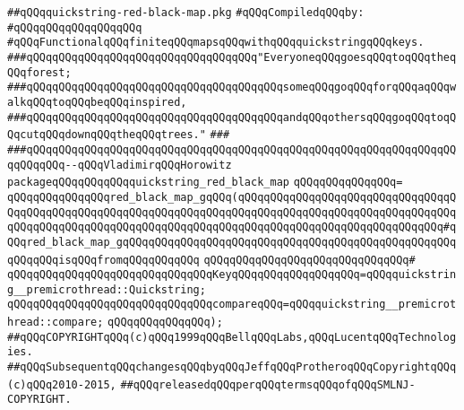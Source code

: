 \label{src/lib/src/quickstring-red-black-map.pkg}
\verb|##qQQqquickstring-red-black-map.pkg|\newline
\newline
\verb|#qQQqCompiledqQQqby:|\newline
\verb|#qQQqqQQqqQQqqQQqqQQq|\newline
\newline
\verb|#qQQqFunctionalqQQqfiniteqQQqmapsqQQqwithqQQqquickstringqQQqkeys.|\newline
\newline
\newline
\verb|###qQQqqQQqqQQqqQQqqQQqqQQqqQQqqQQqqQQq"EveryoneqQQqgoesqQQqtoqQQqtheqQQqforest;|\newline
\verb|###qQQqqQQqqQQqqQQqqQQqqQQqqQQqqQQqqQQqqQQqsomeqQQqgoqQQqforqQQqaqQQqwalkqQQqtoqQQqbeqQQqinspired,|\newline
\verb|###qQQqqQQqqQQqqQQqqQQqqQQqqQQqqQQqqQQqqQQqandqQQqothersqQQqgoqQQqtoqQQqcutqQQqdownqQQqtheqQQqtrees."|\newline
\verb|###|\newline
\verb|###qQQqqQQqqQQqqQQqqQQqqQQqqQQqqQQqqQQqqQQqqQQqqQQqqQQqqQQqqQQqqQQqqQQqqQQqqQQq--qQQqVladimirqQQqHorowitz|\newline
\newline
\newline
\verb|packageqQQqqQQqqQQqquickstring_red_black_map|\newline
\verb|qQQqqQQqqQQqqQQq=|\newline
\verb|qQQqqQQqqQQqqQQqred_black_map_gqQQq(qQQqqQQqqQQqqQQqqQQqqQQqqQQqqQQqqQQqqQQqqQQqqQQqqQQqqQQqqQQqqQQqqQQqqQQqqQQqqQQqqQQqqQQqqQQqqQQqqQQqqQQqqQQqqQQqqQQqqQQqqQQqqQQqqQQqqQQqqQQqqQQqqQQqqQQqqQQqqQQqqQQqqQQqqQQq#qQQqred_black_map_gqQQqqQQqqQQqqQQqqQQqqQQqqQQqqQQqqQQqqQQqqQQqqQQqqQQqqQQqqQQqisqQQqfromqQQqqQQqqQQq|\newline
\verb|qQQqqQQqqQQqqQQqqQQqqQQqqQQqqQQq#|\newline
\verb|qQQqqQQqqQQqqQQqqQQqqQQqqQQqqQQqKeyqQQqqQQqqQQqqQQqqQQq=qQQqquickstring__premicrothread::Quickstring;|\newline
\verb|qQQqqQQqqQQqqQQqqQQqqQQqqQQqqQQqcompareqQQq=qQQqquickstring__premicrothread::compare;|\newline
\verb|qQQqqQQqqQQqqQQq);|\newline
\newline
\newline
\verb|##qQQqCOPYRIGHTqQQq(c)qQQq1999qQQqBellqQQqLabs,qQQqLucentqQQqTechnologies.|\newline
\verb|##qQQqSubsequentqQQqchangesqQQqbyqQQqJeffqQQqProtheroqQQqCopyrightqQQq(c)qQQq2010-2015,|\newline
\verb|##qQQqreleasedqQQqperqQQqtermsqQQqofqQQqSMLNJ-COPYRIGHT.|\newline

